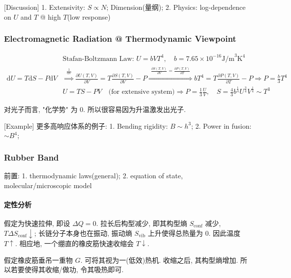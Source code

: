 \documentclass[../../main.tex]{subfiles}
\begin{document}
[Discussion] 1. Extensivity: $S\propto N$; Dimension(量纲);   2. Physics: log-dependence on $U$ and $T$ @ high $T$(low response)
\subsubsection{Electromagnetic Radiation @ Thermodynamic Viewpoint}

$\begin{aligned}
    &\text{Stafan-Boltzmann Law: }U = bVT^{4}, \quad b = 7.65\times 10^{-16}\text{J/m}^{3}\text{K}^{4}\\
    \mathrm{d}U = T\mathrm{d}S - P\mathrm{d}V&\stackrel{\begin{aligned}
        \frac{1}{\mathrm{d}V}
    \end{aligned}}{\Longrightarrow}
    \frac{\partial U(T,V)}{\partial V} = T\frac{\partial S(T,V)}{\partial V} - P\stackrel{\begin{aligned}
        \frac{\partial S(T,V)}{\partial V} = \frac{\partial P(T,V)}{\partial T}
    \end{aligned}}{\Longrightarrow}
    bT^{4} = T\frac{\partial P(T,V)}{\partial T} - P\Longrightarrow P = \frac{b}{3}T^{4}\\
    &U= TS - PV\quad \text{(for extensive system)}\Longrightarrow P = \frac{1}{3}\frac{U}{V},\quad S = \frac{4}{3}b^{\frac{1}{4}}U^{\frac{3}{4}}V^{\frac{1}{4}}\sim T^{3}
\end{aligned}$

对光子而言, "化学势" 为 0. 所以很容易因为升温激发出光子.

[Example] 更多高响应体系的例子: 1. Bending rigidity: $B\sim h^{3}$; 2. Power in fusion: $\sim B^{4}$;

\subsubsection{Rubber Band}
前置: 1. thermodynamic laws(general); 2. equation of state, molecular/microscopic model

\paragraph{定性分析}
假定为快速拉伸, 即设 $\Delta Q = 0$. 拉长后构型减少, 即其构型熵 $S_{\text{conf}}$ 减少, $T\Delta S_{\text{conf}}\downarrow$; 长链分子本身也在振动, 振动熵 $S_{\text{vib}}$ 上升使得总热量为 $0$. 因此温度 $T\uparrow$. 相应地, 一个绷直的橡皮筋快速收缩会 $T\downarrow$.

假定橡皮筋垂吊一重物 $G$. 可将其视为一(低效)热机. 收缩之后, 其构型熵增加. 所以若要使得其收缩/做功, 令其吸热即可.
\end{document}
